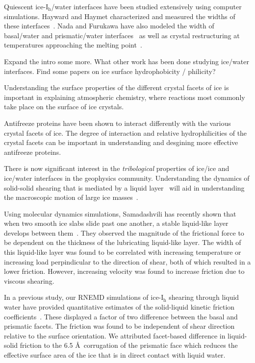 \documentclass[aps,jcp,preprint,showpacs,superscriptaddress,groupedaddress]{revtex4}  %
\begin{document}
Quiescent ice-I$_\mathrm{h}$/water interfaces have been studied
extensively using computer simulations. Hayward and Haymet
characterized and measured the widths of these
interfaces~\cite{Hayward01,Hayward02}.  Nada and Furukawa have also
modeled the width of basal/water and prismatic/water
interfaces~\cite{Nada95} as well as crystal restructuring at
temperatures approaching the melting point~\cite{Nada00}.

Expand the intro some more. What other work has been done studying ice/water
interfaces. Find some papers on ice surface hydrophobicity / philicity?

Understanding the surface properties of the different crystal facets
of ice is important in explaining atmospheric chemistry, where reactions
most commonly take place on the surface of ice crystals. 

Antifreeze proteins have been shown to interact differently with the various 
crystal facets of ice. The degree of interaction and relative hydrophilicities
of the crystal facets can be important in understanding and desgining more 
effective antifreeze proteins.

There is now significant interest in the \textit{tribological}
properties of ice/ice and ice/water interfaces in the geophysics
community.  Understanding the dynamics of solid-solid shearing that is
mediated by a liquid layer~\cite{Cuffey99, Bell08} will aid in
understanding the macroscopic motion of large ice
masses~\cite{Casassa91, Sukhorukov13, Pritchard12, Lishman13}.

Using molecular dynamics simulations, Samadashvili has recently shown
that when two smooth ice slabs slide past one another, a stable
liquid-like layer develops between them~\cite{Samadashvili13}. They observed
the magnitude of the frictional force to be dependent on the thickness of the 
lubricating liquid-like layer. The width of this liquid-like layer was found 
to be correlated with increasing temperature or increasing load perpindicular 
to the direction of shear, both of which resulted in a lower friction. 
However, increasing velocity was found to increase friction due to viscous
shearing. 

In a previous study, our RNEMD simulations of ice-I$_\mathrm{h}$ shearing
through liquid water have provided quantitative estimates of the
solid-liquid kinetic friction coefficients~\cite{Louden13}. These
displayed a factor of two difference between the basal and prismatic
facets.  The friction was found to be independent of shear direction
relative to the surface orientation.  We attributed facet-based
difference in liquid-solid friction to the 6.5 \AA\ corrugation of the
prismatic face which reduces the effective surface area of the ice
that is in direct contact with liquid water.
\end{document}
